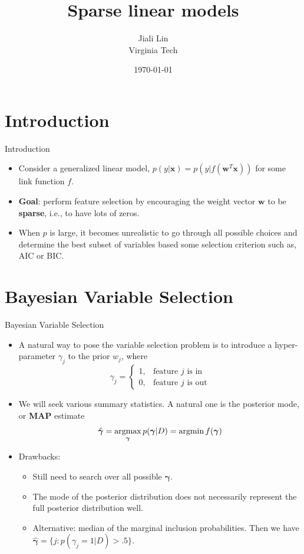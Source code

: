 \documentclass[10pt,mathserif]{beamer}
\title{\large \bfseries Sparse linear models}
\author{Jiali Lin\\[3ex] 
        Virginia Tech}
\date{\today}
\begin{document}
\frame{
\thispagestyle{empty}
\titlepage
}

\section{Introduction}
\begin{frame}{Introduction}
    \begin{itemize}
    \item Consider a generalized linear model, $p(y|\bm{x}) = p(y|f(\bm{w}^T \bm{x}))$ for some link function $f$. 
    \item \textbf{Goal}: perform feature selection by encouraging the weight vector $\bm{w}$ to be \textbf{sparse}, i.e., to have lots of zeros.
    \item When $p$ is large, it becomes unrealistic to go through all possible choices and determine the best subset of variables based some selection criterion such as, AIC or BIC.
    \end{itemize}
\end{frame}

\section{Bayesian Variable Selection}
\begin{frame}{Bayesian Variable Selection}
    \begin{itemize}
        \item A natural way to pose the variable selection problem is to introduce a hyper-parameter $\gamma_j$ to the prior $w_j$, where 
        \begin{equation*}
          \gamma_j=\begin{cases}
            1, & \text{feature $j$ is in}\\
            0, & \text{feature $j$ is out}
          \end{cases}
        \end{equation*}
        \item We will seek various summary statistics. A natural one is the posterior mode, or \textbf{MAP} estimate
        \begin{equation*}
          \hat{\bm{\gamma}} = \mathop{\rm argmax}_{\bm{\gamma}}p(\bm{\gamma}|D) = \mathop{\rm argmin} f(\bm{\gamma})
        \end{equation*} 
        \item Drawbacks:
            \begin{itemize}
            \item Still need to search over all possible $\bm{\gamma}$.
            \item The mode of the posterior distribution does not necessarily represent the full posterior distribution well.
            \item Alternative: median of the marginal inclusion probabilities. Then we have $\hat{\bm{\gamma}} = \{j : p(\gamma_j=1|D) > .5\}$.
            \end{itemize}
    \end{itemize}
\end{frame}
\end{document}
